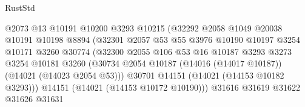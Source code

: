 \begin{lexlean}{RustStd}
\begin{coremodule}
                                        @2073
                                        @13
                                        @10191
                                        @10200
                                        @3293
                                        @10215
                                        (@32292
                                          @2058
                                          @1049
                                          @20038
                                          @10191
                                          @10198
                                          @8894
                                          (@32301
                                            @2057
                                            @53
                                            @55
                                            @3976
                                            @10190
                                            @10197
                                            @3254
                                            @10171
                                            @3260
                                            @30774
                                            (@32300
                                              @2055
                                              @106
                                              @53
                                              @16
                                              @10187
                                              @3293
                                              @3273
                                              @3254
                                              @10181
                                              @3260
                                              (@30734
                                                @2054
                                                @10187
                                                (@14016 (@14017 @10187))
                                                (@14021 (@14023 @2054 @53)))
                                              @30701
                                              @14151
                                              (@14021 (@14153 @10182 @3293)))
                                            @14151
                                            (@14021 (@14153 @10172 @10190)))
                                          @31616
                                          @31619
                                          @31622
                                          @31626
                                          @31631

\end{coremodule}
\end{lexlean}
